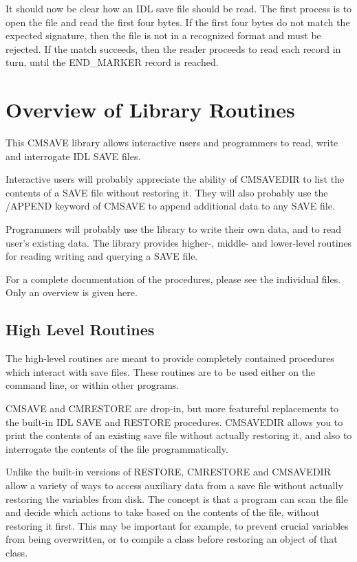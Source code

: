 \documentclass[12pt]{article}
\begin{document}
It should now be clear how an IDL save file should be read.  The first
process is to open the file and read the first four bytes.  If the
first four bytes do not match the expected signature, then the file is
not in a recognized format and must be rejected.  If the match
succeeds, then the reader proceeds to read each record in turn, until
the END\_MARKER record is reached.

\section{Overview of Library Routines \label{s:library}}

This CMSAVE library allows interactive users and programmers to read,
write and interrogate IDL SAVE files.

Interactive users will probably appreciate the ability of CMSAVEDIR to
list the contents of a SAVE file without restoring it.  They will also
probably use the /APPEND keyword of CMSAVE to append additional data
to any SAVE file.

Programmers will probably use the library to write their own data, and
to read user's existing data.  The library provides higher-, middle-
and lower-level routines for reading writing and querying a SAVE
file.

For a complete documentation of the procedures, please see the
individual files.  Only an overview is given here.

\subsection{High Level Routines\label{s::highlevel}}

The high-level routines are meant to provide completely contained
procedures which interact with save files.  These routines are to be
used either on the command line, or within other programs.

CMSAVE and CMRESTORE are drop-in, but more featureful replacements to
the built-in IDL SAVE and RESTORE procedures.  CMSAVEDIR allows you to
print the contents of an existing save file without actually restoring
it, and also to interrogate the contents of the file programmatically.

Unlike the built-in versions of RESTORE, CMRESTORE and CMSAVEDIR allow
a variety of ways to access auxiliary data from a save file without
actually restoring the variables from disk.  The concept is that a
program can scan the file and decide which actions to take based on
the contents of the file, without restoring it first.  This may be
important for example, to prevent crucial variables from being
overwritten, or to compile a class before restoring an object of that
class.
\end{document}
